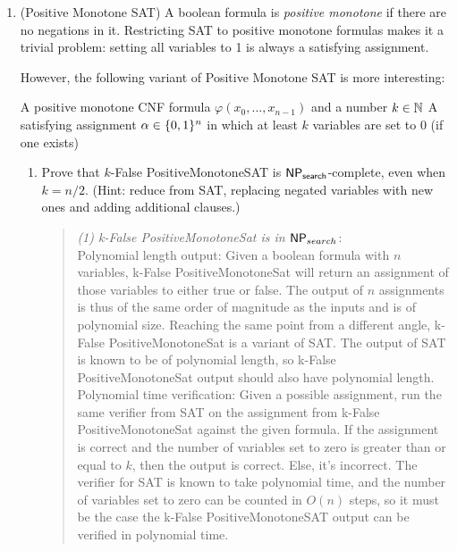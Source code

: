 \documentclass[11pt]{article}
\begin{document}
\begin{enumerate}
    \item (Positive Monotone SAT)
    A boolean formula is {\em positive monotone} if there are no negations in it.  Restricting SAT to positive monotone formulas makes it a trivial problem: setting all variables to 1 is always a satisfying assignment.
    
    However, the following variant of Positive Monotone SAT is more interesting:
    
        {A positive monotone CNF formula $\varphi(x_0,\ldots,x_{n-1})$ and a number $k\in \mathbb{N}$}
        {A satisfying assignment $\alpha\in\{0,1\}^n$ in which at least $k$ variables are set to 0 (if one exists)}
    
    \begin{enumerate}
        \item Prove that $k$-False PositiveMonotoneSAT is $\mathsf{NP_{search}}$-complete, even when $k=n/2$.  (Hint: reduce from SAT, replacing negated variables with new ones and adding additional clauses.)
        \begin{quote}
            \color{purple}
            \textit{(1) k-False PositiveMonotoneSat is in $\mathsf{NP}_{search}$}: \\

            Polynomial length output: Given a boolean formula with $n$ variables, k-False PositiveMonotoneSat will return an assignment of those variables to either true or false. The output of $n$ assignments is thus of the same order of magnitude as the inputs and is of polynomial size. Reaching the same point from a different angle, k-False PositiveMonotoneSat is a variant of SAT. The output of SAT is known to be of polynomial length, so k-False PositiveMonotoneSat output should also have polynomial length.  \\

            Polynomial time verification: Given a possible assignment, run the same verifier from SAT on the assignment from k-False PositiveMonotoneSat against the given formula. If the assignment is correct and the number of variables set to zero is greater than or equal to $k$, then the output is correct. Else, it's incorrect. The verifier for SAT is known to take polynomial time, and the number of variables set to zero can be counted in $O(n)$ steps, so it must be the case the k-False PositiveMonotoneSAT output can be verified in polynomial time. \\


\end{quote}
\end{enumerate}
\end{enumerate}
\end{document}
